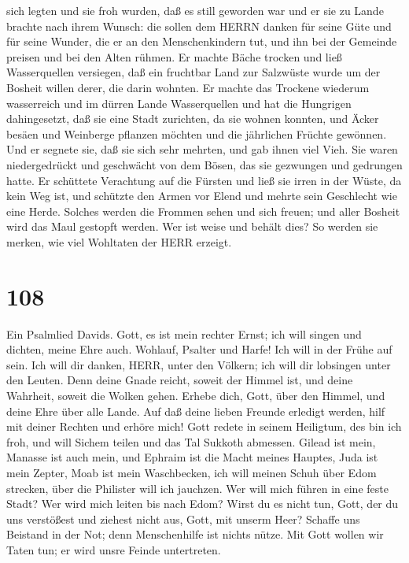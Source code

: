 sich legten  und sie froh wurden, daß es still geworden war
und er sie zu Lande brachte nach ihrem Wunsch:  die sollen
dem HERRN danken für seine Güte und für seine Wunder, die er an den
Menschenkindern tut,  und ihn bei der Gemeinde preisen und
bei den Alten rühmen.  Er machte Bäche trocken und ließ
Wasserquellen versiegen,  daß ein fruchtbar Land zur
Salzwüste wurde um der Bosheit willen derer, die darin wohnten.
 Er machte das Trockene wiederum wasserreich und im dürren
Lande Wasserquellen  und hat die Hungrigen dahingesetzt,
daß sie eine Stadt zurichten, da sie wohnen konnten,  und
Äcker besäen und Weinberge pflanzen möchten und die jährlichen Früchte
gewönnen.  Und er segnete sie, daß sie sich sehr mehrten,
und gab ihnen viel Vieh.  Sie waren niedergedrückt und
geschwächt von dem Bösen, das sie gezwungen und gedrungen hatte.
 Er schüttete Verachtung auf die Fürsten und ließ sie irren
in der Wüste, da kein Weg ist,  und schützte den Armen vor
Elend und mehrte sein Geschlecht wie eine Herde.  Solches
werden die Frommen sehen und sich freuen; und aller Bosheit wird das
Maul gestopft werden.  Wer ist weise und behält dies? So
werden sie merken, wie viel Wohltaten der HERR erzeigt.

\hypertarget{section-107}{%
\section{108}\label{section-107}}

 Ein Psalmlied Davids. Gott, es ist mein rechter Ernst; ich
will singen und dichten, meine Ehre auch.  Wohlauf, Psalter
und Harfe! Ich will in der Frühe auf sein.  Ich will dir
danken, HERR, unter den Völkern; ich will dir lobsingen unter den
Leuten.  Denn deine Gnade reicht, soweit der Himmel ist, und
deine Wahrheit, soweit die Wolken gehen.  Erhebe dich, Gott,
über den Himmel, und deine Ehre über alle Lande.  Auf daß
deine lieben Freunde erledigt werden, hilf mit deiner Rechten und erhöre
mich!  Gott redete in seinem Heiligtum, des bin ich froh,
und will Sichem teilen und das Tal Sukkoth abmessen.  Gilead
ist mein, Manasse ist auch mein, und Ephraim ist die Macht meines
Hauptes, Juda ist mein Zepter,  Moab ist mein Waschbecken,
ich will meinen Schuh über Edom strecken, über die Philister will ich
jauchzen.  Wer will mich führen in eine feste Stadt? Wer
wird mich leiten bis nach Edom?  Wirst du es nicht tun,
Gott, der du uns verstößest und ziehest nicht aus, Gott, mit unserm
Heer?  Schaffe uns Beistand in der Not; denn Menschenhilfe
ist nichts nütze.  Mit Gott wollen wir Taten tun; er wird
unsre Feinde untertreten.

